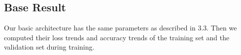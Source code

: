 \documentclass{article}
\begin{document}





\subsection{Base Result}

Our basic architecture has the same parameters as described in 3.3. Then we computed their loss trends and accuracy trends of the training set and the validation set during training.
\end{document}
